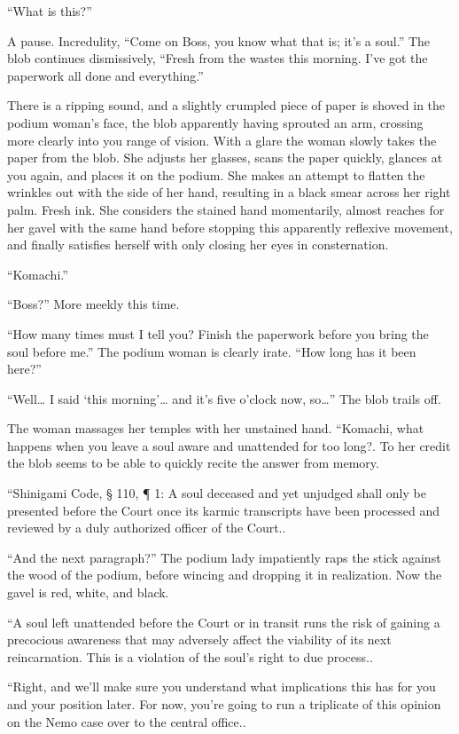 \documentclass[a4paper,12pt]{book}
\begin{document}
``What is this?''

A pause. Incredulity, ``Come on Boss, you know what that is; it’s a soul.'' The blob continues dismissively, ``Fresh from the wastes this morning. I’ve got the paperwork all done and everything.''

There is a ripping sound, and a slightly crumpled piece of paper is shoved in the podium woman’s face, the blob apparently having sprouted an arm, crossing more clearly into you range of vision. With a glare the woman slowly takes the paper from the blob. She adjusts her glasses, scans the paper quickly, glances at you again, and places it on the podium. She makes an attempt to flatten the wrinkles out with the side of her hand, resulting in a black smear across her right palm. Fresh ink. She considers the stained hand momentarily, almost reaches for her gavel with the same hand before stopping this apparently reflexive movement, and finally satisfies herself with only closing her eyes in consternation.

``Komachi.''

``Boss?'' More meekly this time.

``How many times must I tell you? Finish the paperwork before you bring the soul before me.'' The podium woman is clearly irate. ``How long has it been here?''

``Well… I said ‘this morning’… and it’s five o’clock now, so…'' The blob trails off.

The woman massages her temples with her unstained hand. ``Komachi, what happens when you leave a soul aware and unattended for too long?.
To her credit the blob seems to be able to quickly recite the answer from memory.

``Shinigami Code, § 110, ¶ 1: A soul deceased and yet unjudged shall only be presented before the Court once its karmic transcripts have been processed and reviewed by a duly authorized officer of the Court..

``And the next paragraph?'' The podium lady impatiently raps the stick against the wood of the podium, before wincing and dropping it in realization. Now the gavel is red, white, and black.

``A soul left unattended before the Court or in transit runs the risk of gaining a precocious awareness that may adversely affect the viability of its next reincarnation. This is a violation of the soul’s right to due process..

``Right, and we’ll make sure you understand what implications this has for you and your position later. For now, you’re going to run a triplicate of this opinion on the Nemo case over to the central office..
\end{document}
